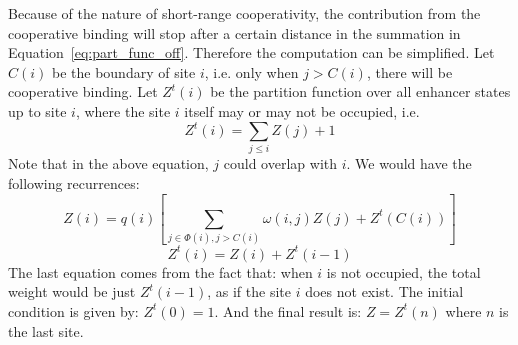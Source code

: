 \documentclass[11pt]{article}
\begin{document}
\begin{enumerate}
\begin{enumerate}
Because of the nature of short-range cooperativity, the contribution from the cooperative binding will stop after a certain distance in the summation in Equation~\ref{eq:part_func_off}. Therefore the computation can be simplified. Let $C(i)$ be the boundary of site $i$, i.e. only when $j > C(i)$, there will be cooperative binding. Let $Z^t(i)$ be the partition function over all enhancer states up to site $i$, where the site $i$ itself may or may not be occupied, i.e.
\begin{equation}
Z^t(i) = \sum_{j \leq i} Z(j) + 1
\end{equation}
Note that in the above equation, $j$ could overlap with $i$. We would have the following recurrences: 
\begin{equation}
Z(i) = q(i) \left[ \sum_{j \in \Phi (i), j > C(i)} \omega(i,j) Z(j) + Z^t(C(i)) \right]
\end{equation}
\begin{equation}
Z^t(i) = Z(i) + Z^t(i-1)
\end{equation}
The last equation comes from the fact that: when $i$ is not occupied, the total weight would be just $Z^t(i-1)$, as if the site $i$ does not exist. The initial condition is given by: $Z^t(0) = 1$. And the final result is: $Z = Z^t(n)$ where $n$ is the last site. 

\end{enumerate}




\end{enumerate}
\end{document}
